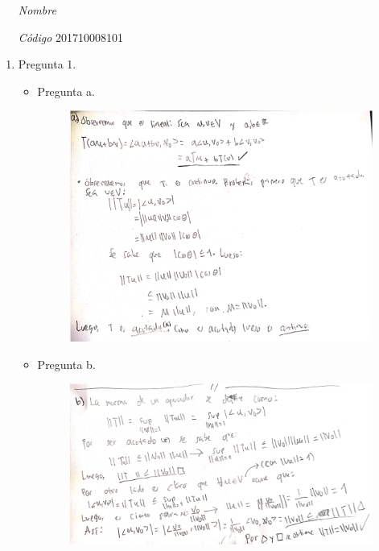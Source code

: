 \documentclass[fleqn]{article}
\begin{document}
 \vspace{0.3cm}
   \begin{itemize}[leftmargin=6.25cm, labelsep=0.5cm]

     \item[\textit{Nombre}]  %
     \item[\textit{Código}] 201710008101 %

   \end{itemize}

   \begin{enumerate}
     \item Pregunta 1.
       \begin{itemize}
         \item Pregunta a.
            \begin{figure}[H]
              \centering \includegraphics[scale=.5]{figs/1a}
            \end{figure}

         \item Pregunta b.
         \begin{figure}[H]
           \centering
           \includegraphics[scale=.5]{figs/1b}
         \end{figure}


\end{itemize}
\end{enumerate}
\end{document}
